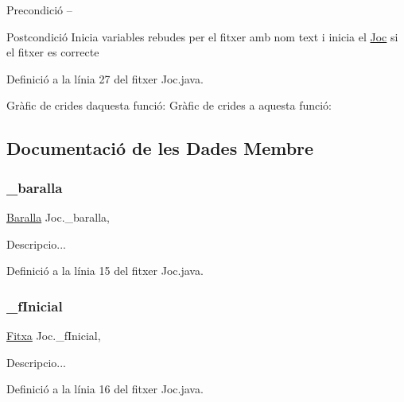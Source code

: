 \begin{DoxyPrecond}{Precondició}
-- 
\end{DoxyPrecond}
\begin{DoxyPostcond}{Postcondició}
Inicia variables rebudes per el fitxer amb nom text i inicia el \mbox{\hyperlink{class_joc}{Joc}} si el fitxer es correcte 
\end{DoxyPostcond}


Definició a la línia 27 del fitxer Joc.\+java.

Gràfic de crides d\textquotesingle{}aquesta funció\+:
Gràfic de crides a aquesta funció\+:


\subsection{Documentació de les Dades Membre}
\mbox{\label{class_joc_a9d7c9ceefbdca067a0d82fa5f6806aaa}} 
\subsubsection{\texorpdfstring{\+\_\+baralla}{\_baralla}}
{\footnotesize\ttfamily \mbox{\hyperlink{class_baralla}{Baralla}} Joc.\+\_\+baralla\hspace{0.3cm}{\ttfamily [static]}, {\ttfamily [private]}}



Descripcio... 



Definició a la línia 15 del fitxer Joc.\+java.

\mbox{\label{class_joc_a9118adfa2c6c65ce5b759ed914801950}} 
\subsubsection{\texorpdfstring{\+\_\+f\+Inicial}{\_fInicial}}
{\footnotesize\ttfamily \mbox{\hyperlink{class_fitxa}{Fitxa}} Joc.\+\_\+f\+Inicial\hspace{0.3cm}{\ttfamily [static]}, {\ttfamily [private]}}



Descripcio... 



Definició a la línia 16 del fitxer Joc.\+java.

